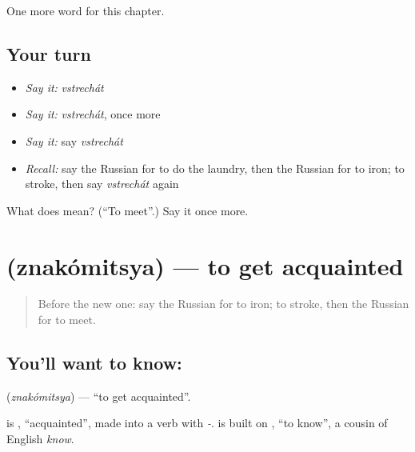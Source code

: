 \begin{grammarlens}[title={What you've built}]
One more word for this chapter.
\end{grammarlens}

\subsection*{Your turn}
\begin{itemize}
\raggedright
  \item \emph{Say it:} \emph{vstrechát}
  \item \emph{Say it:} \emph{vstrechát}, once more
  \item \emph{Say it:} say \emph{vstrechát}
  \item \emph{Recall:} say the Russian for to do the laundry, then the Russian for to iron; to stroke, then say \emph{vstrechát} again
\end{itemize}

\begin{tcolorbox}[breakable,colback=teal!4,colframe=teal!35!black,title={Before you move on}]
What does  mean? (\textquotedblleft{}To meet\textquotedblright{}.) Say it once more.
\end{tcolorbox}
\section[\texorpdfstring{\ru{знакомиться} (znakómitsya)}{знакомиться (znakómitsya)}]{ (znakómitsya) — to get acquainted}

\label{lesson:RU-C141-znakomitsya}



\begin{quote}
Before the new one: say the Russian for to iron; to stroke, then the Russian for to meet.
\end{quote}

\subsection*{You'll want to know: }
\textbf{} (\emph{znakómitsya}) — \textquotedblleft{}to get acquainted\textquotedblright{}.

\begin{cousinweb}
\textbf{} is \emph{}, \textquotedblleft{}acquainted\textquotedblright{}, made into a verb with \emph{-}. \emph{} is built on \emph{}, \textquotedblleft{}to know\textquotedblright{}, a cousin of English \emph{know}.
\end{cousinweb}

